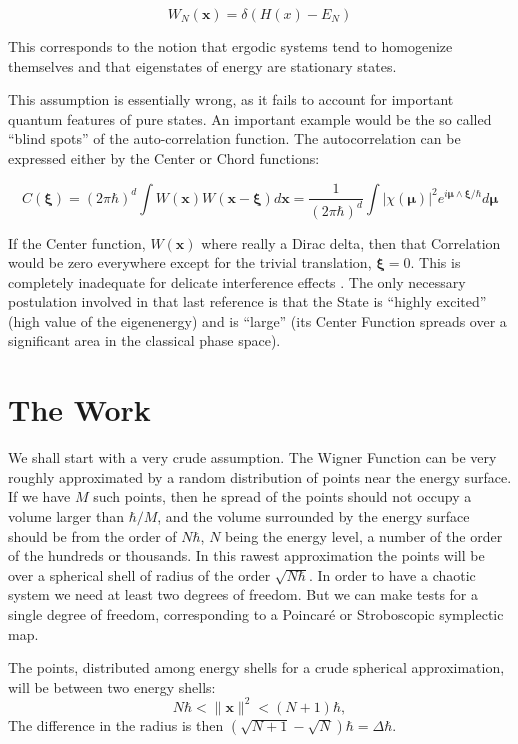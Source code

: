 \documentclass[a4paper,12pt]{article}
\newcommand{\xfase}{\mathbf{x}}
\newcommand{\xifase}{ {\boldsymbol{\xi}} }
\newcommand{\mufase}{ {\boldsymbol{\mu}} }
\begin{document}
\begin{equation}
W_N(\xfase)=\delta (H(x)-E_N)
\end{equation}

This corresponds to the notion that ergodic systems tend to 
homogenize themselves and that eigenstates of energy are
stationary states.

This assumption is essentially wrong, as it fails to account
for important quantum features of pure states. An important example would
be the so called ``blind spots'' \cite{Zambrano09} 
of the auto-correlation function.  The autocorrelation can be 
expressed either by the Center or Chord functions:

\begin{equation}
C(\xifase)=(2\pi\hbar)^d \int W(\xfase)W(\xfase-\xifase) d\xfase
=\frac{1}{(2\pi\hbar)^d}\int |\chi(\mufase)|^2 e^{i\mufase\wedge\xifase/\hbar}
d\mufase
\end{equation}

If the Center function, $W(\xfase)$ where really a Dirac delta,
then that Correlation would be zero everywhere except for 
the trivial translation,  $\xifase=0$. This is completely
inadequate for delicate interference effects \cite{Zambrano08}.
The only necessary postulation involved in that
last reference  is that the
State is ``highly excited'' (high value of the eigenenergy) 
and is ``large'' (its Center Function spreads over a significant 
area in
the classical phase space).

\section{The Work}

We shall start with a very crude assumption.
 The Wigner Function can be very roughly approximated
by a random distribution of points near the energy surface. 
If we have $M$ such points, then
he spread of the points should not occupy a volume larger than
$\hbar/M$, and the volume surrounded by the energy surface
should be from the order of $N\hbar$, $N$ being 
the energy level, 
a number
of the order of the hundreds or thousands.  In this rawest
approximation the points will be over a spherical shell of
radius of the order $\sqrt{N\hbar}$. In order to have
a chaotic system we need at least two degrees of freedom.
But we can make tests for a single degree of freedom,
corresponding to a Poincaré or Stroboscopic 
symplectic map. 

The points, distributed among energy shells for
a crude spherical approximation, will be between
two energy shells:
\begin{equation}
N\hbar< \|\xfase\|^2<(N+1)\hbar,
\end{equation}
The difference in the radius is then
$(\sqrt{N+1}-\sqrt{N})\hbar=\Delta\hbar$.
\end{document}

